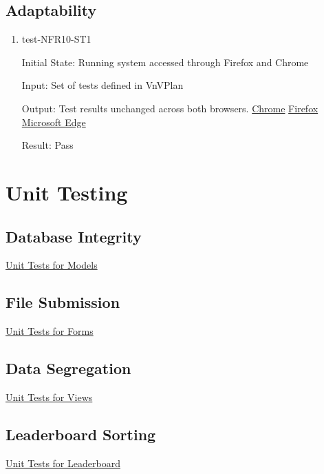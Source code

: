 \documentclass[12pt, titlepage]{article}
\begin{document}
\subsection{Adaptability}
\begin{enumerate}
\item{test-NFR10-ST1} \label{test-NFR10-ST1}

Initial State: Running system accessed through Firefox and Chrome

Input: Set of tests defined in VnVPlan

Output: Test results unchanged across both browsers. 
\href{https://github.com/AidanMariglia/SOCAlgoTestPlatform/blob/main/docs/VnVReport/images/chrome.png}{Chrome} \href{https://github.com/AidanMariglia/SOCAlgoTestPlatform/blob/main/docs/VnVReport/images/firefox.png}{Firefox} \href{https://github.com/AidanMariglia/SOCAlgoTestPlatform/blob/main/docs/VnVReport/images/microsoft_edge.png}{Microsoft Edge} 

Result: Pass
\end{enumerate}
\section{Unit Testing}
\subsection{Database Integrity}
\href{https://github.com/AidanMariglia/SOCAlgoTestPlatform/blob/main/src/webserver/webserver/submissions/tests.py}{Unit Tests for Models}

\subsection{File Submission}
\href{https://github.com/AidanMariglia/SOCAlgoTestPlatform/blob/main/src/webserver/webserver/submissions/tests.py}{Unit Tests for Forms}

\subsection{Data Segregation}
\href{https://github.com/AidanMariglia/SOCAlgoTestPlatform/blob/main/src/webserver/webserver/submissions/tests.py}{Unit Tests for Views}

\subsection{Leaderboard Sorting}
\href{https://github.com/AidanMariglia/SOCAlgoTestPlatform/blob/main/src/webserver/webserver/leaderboard/tests.py}{Unit Tests for Leaderboard}
\end{document}
